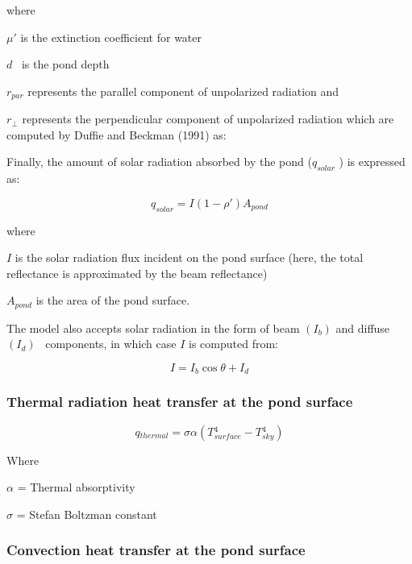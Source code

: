 where

\(\mu '\) is the extinction coefficient for water

\(d\) ~is the pond depth

\({r_{par}}\) represents the parallel component of unpolarized radiation and

\({r_ \bot }\) represents the perpendicular component of unpolarized radiation which are computed by Duffie and Beckman (1991) as: \(_{}\) \(_{}\)

Finally, the amount of solar radiation absorbed by the pond (\({q_{solar}}\) ) is expressed as:

\begin{equation}
{q_{solar}} = I\left( {1 - \rho '} \right){A_{pond}}
\end{equation}

where

\(I\) is the solar radiation flux incident on the pond surface (here, the total reflectance is approximated by the beam reflectance)

\({A_{pond}}\) is the area of the pond surface.

The model also accepts solar radiation in the form of beam \(\left( {{I_b}} \right)\) and diffuse \(\left( {{I_d}} \right)\) ~components, in which case \(I\) is computed from:

\begin{equation}
I = {I_b}\cos \theta  + {I_d}
\end{equation}

\subsubsection{Thermal radiation heat transfer at the pond surface}\label{thermal-radiation-heat-transfer-at-the-pond-surface}

\begin{equation}
q{}_{thermal} = \sigma \alpha (T{{}_{surface}^4} - T{{}_{sky}^4})
\end{equation}

Where

\(\alpha\) = Thermal absorptivity

\(\sigma\) = Stefan Boltzman constant

\subsubsection{Convection heat transfer at the pond surface}\label{convection-heat-transfer-at-the-pond-surface}

